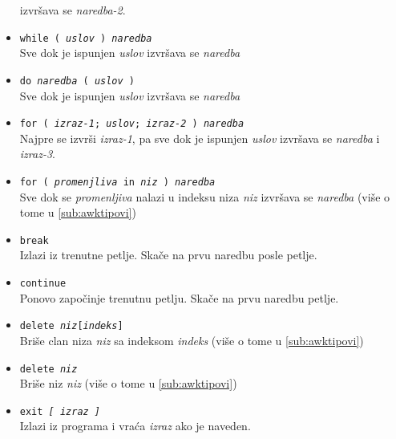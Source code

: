 \documentclass[12pt,a4paper]{article}
\begin{document}
\begin{itemize}
          izvr\v sava se {\it naredba-2}.
        \item
          {\tt while ( {\it uslov} ) {\it naredba}}\\
          Sve dok je ispunjen {\it uslov} izvr\v sava se {\it naredba}
        \item
          {\tt do {\it naredba} ( {\it uslov} )}\\
          Sve dok je ispunjen {\it uslov} izvr\v sava se {\it naredba}
        \item
          {\tt for ( {\it izraz-1}; {\it uslov}; {\it izraz-2} )
          {\it naredba}}\\
          Najpre se izvr\v si {\it izraz-1}, pa sve dok je ispunjen
          {\it uslov} izvr\v sava se {\it naredba} i {\it izraz-3}.
        \item
          {\tt for ( {\it promenjliva} in {\it niz} ) {\it naredba}}\\
          Sve dok se {\it promenljiva} nalazi u indeksu niza {\it niz}
          izvr\v sava se {\it naredba} (vi\v se o tome u \ref{sub:awktipovi})
        \item
          {\tt break}\\
          Izlazi iz trenutne petlje.
          Ska\v ce na prvu naredbu posle petlje.
        \item
          {\tt continue}\\
          Ponovo zapo\v cinje trenutnu petlju.
          Ska\v ce na prvu naredbu petlje.
        \item
          {\tt delete {\it niz}[{\it indeks}]}\\
          Bri\v se clan niza {\it niz} sa indeksom {\it indeks} (vi\v se o
          tome u \ref{sub:awktipovi})
        \item
          {\tt delete {\it niz}}\\
          Bri\v se niz {\it niz} (vi\v se o tome u \ref{sub:awktipovi})
        \item
          {\tt exit {\it[ izraz ]}}\\
          Izlazi iz programa i vra\'ca {\it izraz} ako je naveden.
        \end{itemize}
%
\end{document}
